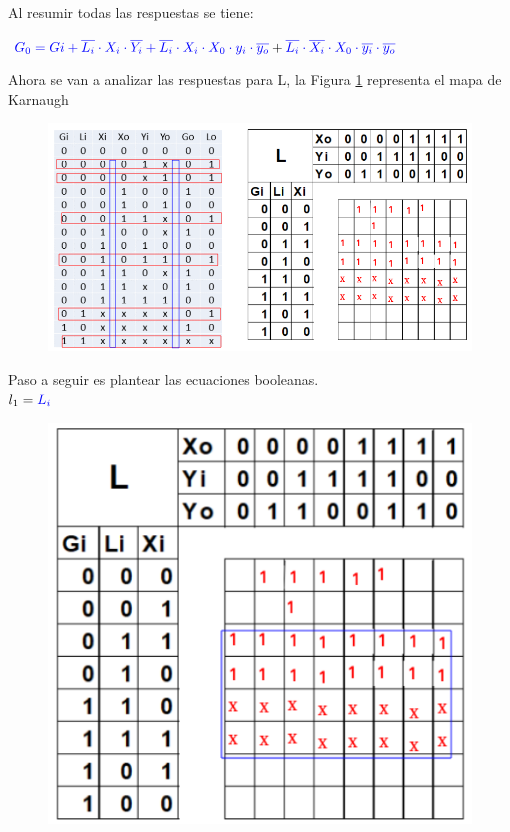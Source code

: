 \documentclass[12pt,letterpaper]{book}
\begin{document}
\begin{multicols}{2}
Al resumir todas las respuestas se tiene:

$\textcolor{blue}{G_0=Gi + \overline{L_i} \cdot X_i \cdot \overline{Y_i} + \overline{L_i} \cdot X_i \cdot X_0\cdot y_i \cdot \overline{y_o}}+ 
 \textcolor{blue}{\overline{L_i} \cdot \overline{ X_i} \cdot X_0 \cdot \overline{y_i}  \cdot \overline{y_o}}$

Ahora se van a analizar las respuestas para L, la Figura \ref{k6} representa el mapa de Karnaugh 

\begin{figure}[H]
\centering
\includegraphics[width=1\linewidth]{figures/k6.png}
\caption{}
\label{k6}
\end{figure}
\vspace{0.2cm}

Paso a seguir es plantear las ecuaciones booleanas.\\
$l_1=\textcolor{blue}{L_i}$

\begin{figure}[H]
\centering
\includegraphics[width=1\linewidth]{figures/k7.png}
\caption{}
\label{k7}
\end{figure}
\vspace{0.2cm}



\end{multicols}
\end{document}
